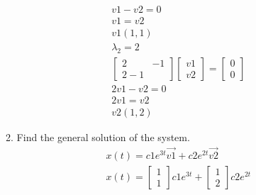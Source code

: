 \documentclass[a4paper,10pt]{article}
\begin{document}
\begin{enumerate}
\begin{enumerate}
\begin{equation}
\begin{aligned}
                        v1-v2=0\\
                        v1=v2\\
                        v1(1,1)\\
                        \lambda_{2}= 2\\
                        \begin{bmatrix}
                            2 &-1\\
                            2 -1
                        \end{bmatrix}
                        \begin{bmatrix}
                            v1\\
                            v2
                        \end{bmatrix}
                        =
                        \begin{bmatrix}
                            0\\
                            0
                        \end{bmatrix}\\
                        2v1-v2=0\\
                        2v1=v2\\
                        v2(1,2)
                    \end{aligned}
                \end{equation}
                
            \item Find the general solution of the system.
                \begin{equation}
                    \begin{aligned}
                        x(t)= c1e^{3t}\vec{v1} + c2e^{2t}\vec{v2}\\
                        x(t)=
                        \begin{bmatrix}
                            1\\
                            1
                        \end{bmatrix}c1e^{3t}
                        +
                        \begin{bmatrix}
                            1\\
                            2
                        \end{bmatrix}c2e^{2t}
                    \end{aligned}
                \end{equation}
                

\end{enumerate}
\end{enumerate}
\end{document}
